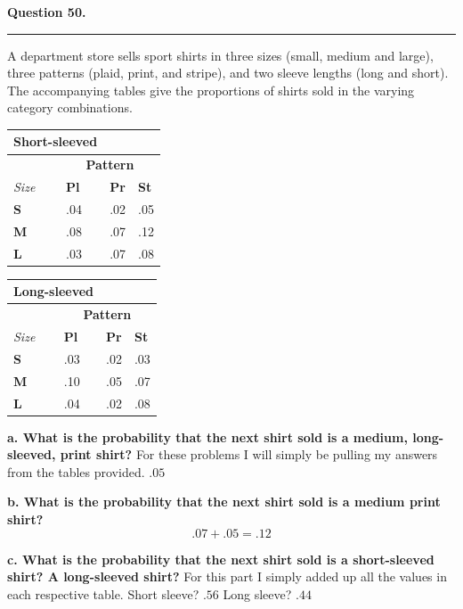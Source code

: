 \textbf{Question 50.} \\
\hrule 

A department store sells sport shirts in three sizes (small, medium and large), three patterns (plaid, print, and stripe), and two sleeve lengths (long and short). The accompanying tables give the proportions of shirts sold in the varying category combinations.

\begin{table}[h]
\begin{tabular}{llll}
\hline
\multicolumn{2}{l}{\textbf{Short-sleeved}} & \textbf{} & \textbf{} \\ \hline
\textbf{} & \multicolumn{3}{c}{\textbf{Pattern}} \\ \hline 
\textit{Size} & \textbf{Pl} & \textbf{Pr} & \textbf{St} \\ \hline 
\textbf{S} & .04 & .02 & .05 \\
\textbf{M} & .08 & .07 & .12 \\
\textbf{L} & .03 & .07 & .08 \\ \hline 
\end{tabular}
\end{table}

\begin{table}[h]
\begin{tabular}{llll}
\hline
\multicolumn{2}{l}{\textbf{Long-sleeved}} & \textbf{} & \textbf{} \\ \hline
\textbf{} & \multicolumn{3}{c}{\textbf{Pattern}} \\ \hline 
\textit{Size} & \textbf{Pl} & \textbf{Pr} & \textbf{St} \\ \hline
\textbf{S} & .03 & .02 & .03 \\
\textbf{M} & .10 & .05 & .07 \\
\textbf{L} & .04 & .02 & .08 \\ \hline 
\end{tabular}
\end{table}

\textbf{a. What is the probability that the next shirt sold is a medium, long-sleeved, print shirt?} \newline 
For these problems I will simply be pulling my answers from the tables provided. $\boxed{.05}$

\textbf{b. What is the probability that the next shirt sold is a medium print shirt?}
\[.07 + .05 = \boxed{.12}\]

\textbf{c. What is the probability that the next shirt sold is a short-sleeved shirt? A long-sleeved shirt?} \newline 
For this part I simply added up all the values in each respective table. \newline 
Short sleeve? $\boxed{.56}$ \newline 
Long sleeve? $\boxed{.44}$

